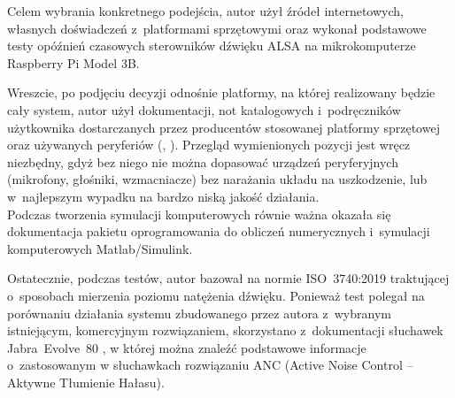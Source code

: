 Celem wybrania konkretnego podejścia, autor użył źródeł internetowych, własnych doświadczeń z~platformami sprzętowymi oraz wykonał podstawowe testy opóźnień czasowych sterowników dźwięku ALSA na mikrokomputerze Raspberry Pi Model 3B.

Wreszcie, po podjęciu decyzji odnośnie platformy, na której realizowany będzie cały system, autor użył dokumentacji, not katalogowych i~podręczników użytkownika dostarczanych przez producentów stosowanej platformy sprzętowej oraz używanych peryferiów (\cite{speakeropamp}, \cite{RM0390}). %
Przegląd wymienionych pozycji jest wręcz niezbędny, gdyż bez niego nie można dopasować urządzeń peryferyjnych (mikrofony, głośniki, wzmacniacze) bez narażania układu na uszkodzenie, lub w~najlepszym wypadku na bardzo niską jakość działania.\\
Podczas tworzenia symulacji komputerowych równie ważna okazała się dokumentacja pakietu oprogramowania do obliczeń numerycznych i~symulacji komputerowych Matlab/Simulink. 

Ostatecznie, podczas testów, autor bazował na normie ISO~3740:2019 \cite{test_norm} traktującej o~sposobach mierzenia poziomu natężenia dźwięku. Ponieważ test polegał na porównaniu działania systemu zbudowanego przez autora z~wybranym istniejącym, komercyjnym rozwiązaniem, skorzystano z~dokumentacji słuchawek Jabra~Evolve~80 \cite{JabraEvolve80}, w której można znaleźć podstawowe informacje o~zastosowanym w słuchawkach rozwiązaniu ANC (Active Noise Control -- Aktywne Tłumienie Hałasu).